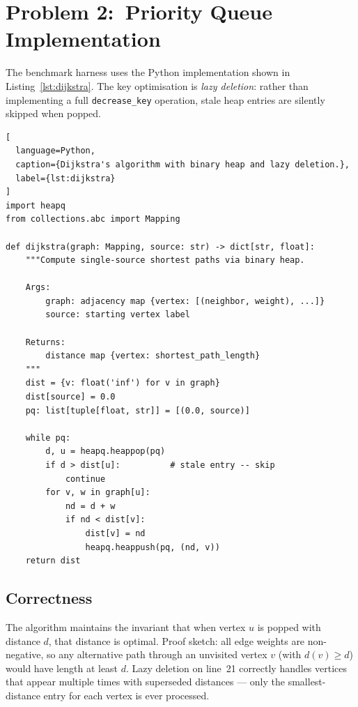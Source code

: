 \section{Problem 2:\ Priority Queue Implementation}

The benchmark harness uses the Python implementation shown in Listing~\ref{lst:dijkstra}.
The key optimisation is \emph{lazy deletion}: rather than implementing a full
\texttt{decrease\_key} operation, stale heap entries are silently skipped when popped.

\begin{lstlisting}[
  language=Python,
  caption={Dijkstra's algorithm with binary heap and lazy deletion.},
  label={lst:dijkstra}
]
import heapq
from collections.abc import Mapping

def dijkstra(graph: Mapping, source: str) -> dict[str, float]:
    """Compute single-source shortest paths via binary heap.

    Args:
        graph: adjacency map {vertex: [(neighbor, weight), ...]}
        source: starting vertex label

    Returns:
        distance map {vertex: shortest_path_length}
    """
    dist = {v: float('inf') for v in graph}
    dist[source] = 0.0
    pq: list[tuple[float, str]] = [(0.0, source)]

    while pq:
        d, u = heapq.heappop(pq)
        if d > dist[u]:          # stale entry -- skip
            continue
        for v, w in graph[u]:
            nd = d + w
            if nd < dist[v]:
                dist[v] = nd
                heapq.heappush(pq, (nd, v))
    return dist
\end{lstlisting}

\subsection{Correctness}

The algorithm maintains the invariant that when vertex $u$ is popped with distance $d$, that
distance is optimal. Proof sketch: all edge weights are non-negative, so any alternative path
through an unvisited vertex $v$ (with $d(v) \ge d$) would have length at least $d$. Lazy
deletion on line~21 correctly handles vertices that appear multiple times with superseded
distances --- only the smallest-distance entry for each vertex is ever processed.
